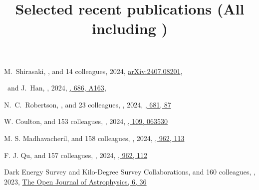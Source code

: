 \title{Selected recent publications {\small (All including \myself)}}


\noindent



\begin{etaremune}

\item
M.~Shirasaki, \myself, and 14 colleagues,
2024, \href{https://ui.adsabs.harvard.edu/abs/2024arXiv240708201S/abstract}{arXiv:2407.08201},
\accepted{\prd}

\item
\myself\ and J.~Han,
,
2024, \href{https://ui.adsabs.harvard.edu/abs/2024A&A...686A.163S/abstract}{\aap, 686, A163},
   
\item
N.~C.~Robertson, \myself, and 23 colleagues,
,
2024, \href{https://ui.adsabs.harvard.edu/abs/2024A&A...681A..87R/abstract}{\aap, 681, 87}

\item
W. Coulton, and 153 colleagues,
,
2024, \href{https://ui.adsabs.harvard.edu/abs/2024PhRvD.109f3530C}{\prd, 109, 063530}

\item
M. S. Madhavacheril, and 158 colleagues,
,
2024, \href{https://ui.adsabs.harvard.edu/abs/2024ApJ...962..113M}{\apj, 962, 113}

\item
F. J. Qu, and 157 colleagues,
,
2024, \href{https://ui.adsabs.harvard.edu/abs/2024ApJ...962..112Q}{\apj, 962, 112}

\item
Dark Energy Survey and Kilo-Degree Survey Collaborations, and 160 colleagues,
,
2023, \href{https://ui.adsabs.harvard.edu/abs/2023OJAp....6E..36D}{The Open Journal of Astrophysics, 6, 36}


\end{etaremune}
